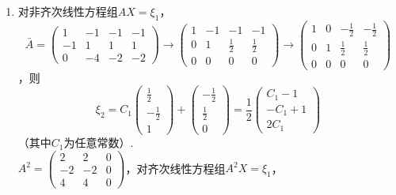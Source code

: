 \documentclass[UTF8,12pt,a4paper,fontset=fandol]{ctexart}
\begin{document}
\begin{solve}
\begin{enumerate}
                \item 对非齐次线性方程组$AX=\xi_1$，\\
                      
\[\bar{A}=\begin{pmatrix}
                              1  & -1 & -1 & -1 \\
                              -1 & 1  & 1  & 1  \\
                              0  & -4 & -2 & -2
                          \end{pmatrix}
                          \rightarrow\begin{pmatrix}
                              1 & -1 & -1       & -1       \\
                              0 & 1  & \frac 12 & \frac 12 \\
                              0 & 0  & 0        & 0
                          \end{pmatrix}
                          \rightarrow\begin{pmatrix}
                              1 & 0 & -\frac 12 & -\frac 12 \\
                              0 & 1 & \frac 12  & \frac 12  \\
                              0 & 0 & 0         & 0
                          \end{pmatrix}\]
，则\\
                      
\[\xi_2=C_1\begin{pmatrix}
                              \frac 12  \\
                              -\frac 12 \\
                              1
                          \end{pmatrix} + \begin{pmatrix}
                              -\frac 12 \\
                              \frac 12  \\
                              0
                          \end{pmatrix}=\dfrac 12\begin{pmatrix}
                              C_1 - 1  \\
                              -C_1 + 1 \\
                              2C_1
                          \end{pmatrix}\]
（其中$C_1$为任意常数）.\\
                      $A^2=\begin{pmatrix}
                              2  & 2  & 0 \\
                              -2 & -2 & 0 \\
                              4  & 4  & 0
                          \end{pmatrix}$，对齐次线性方程组$A^2X=\xi_1$，\\
                      

\end{enumerate}
\end{solve}
\end{document}
